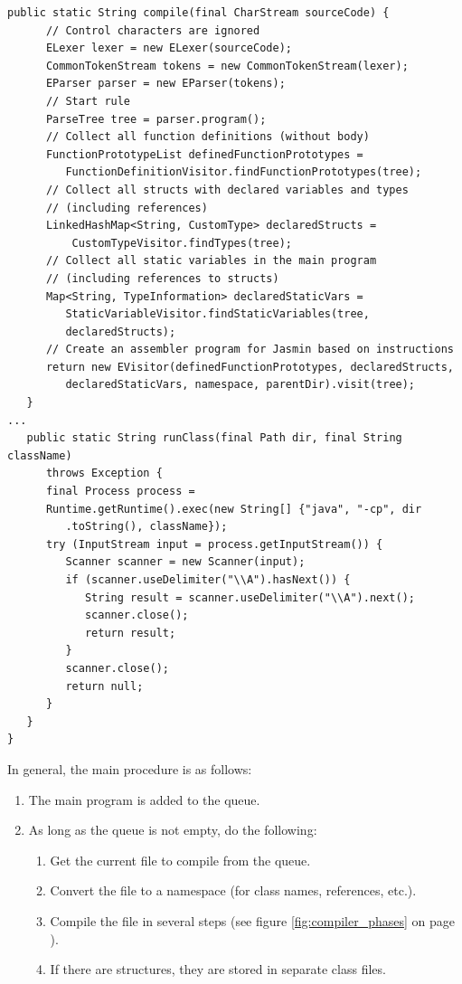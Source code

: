 \begin{lstlisting}[frame=htrbl, caption={Implementation of {\ttfamily Main.java}}, label={lst:main}, basicstyle=\footnotesize]
   public static String compile(final CharStream sourceCode) {
      // Control characters are ignored
      ELexer lexer = new ELexer(sourceCode);
      CommonTokenStream tokens = new CommonTokenStream(lexer);
      EParser parser = new EParser(tokens);
      // Start rule
      ParseTree tree = parser.program();
      // Collect all function definitions (without body)
      FunctionPrototypeList definedFunctionPrototypes =
         FunctionDefinitionVisitor.findFunctionPrototypes(tree);
      // Collect all structs with declared variables and types
      // (including references)
      LinkedHashMap<String, CustomType> declaredStructs =
          CustomTypeVisitor.findTypes(tree);
      // Collect all static variables in the main program
      // (including references to structs)
      Map<String, TypeInformation> declaredStaticVars =
         StaticVariableVisitor.findStaticVariables(tree, 
         declaredStructs);
      // Create an assembler program for Jasmin based on instructions
      return new EVisitor(definedFunctionPrototypes, declaredStructs,
         declaredStaticVars, namespace, parentDir).visit(tree);
   }
...
   public static String runClass(final Path dir, final String className)
      throws Exception {
      final Process process =
      Runtime.getRuntime().exec(new String[] {"java", "-cp", dir
         .toString(), className});
      try (InputStream input = process.getInputStream()) {
         Scanner scanner = new Scanner(input);
         if (scanner.useDelimiter("\\A").hasNext()) {
            String result = scanner.useDelimiter("\\A").next();
            scanner.close();
            return result;
         }
         scanner.close();
         return null;
      }
   }
}
\end{lstlisting}

In general, the main procedure is as follows:

\begin{enumerate}
	\item The main program is added to the queue.
	\item As long as the queue is not empty, do the following:
	\begin{enumerate}
		\item Get the current file to compile from the queue.
		\item Convert the file to a namespace (for class names, references, etc.).
		\item Compile the file in several steps (see figure \ref{fig:compiler_phases} on page \pageref{fig:compiler_phases}).
		\item If there are structures, they are stored in separate class files.
	\end{enumerate}
\end{enumerate}

